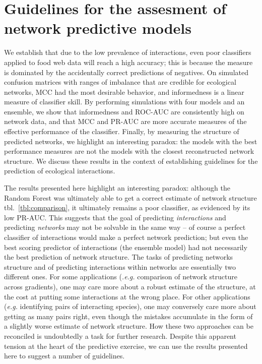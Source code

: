 \documentclass[10pt,oneside]{article}
\begin{document}
\hypertarget{guidelines-for-the-assesment-of-network-predictive-models}{%
\section{Guidelines for the assesment of network predictive
models}\label{guidelines-for-the-assesment-of-network-predictive-models}}

We establish that due to the low prevalence of interactions, even poor
classifiers applied to food web data will reach a high accuracy; this is
because the measure is dominated by the accidentally correct predictions
of negatives. On simulated confusion matrices with ranges of imbalance
that are credible for ecological networks, MCC had the most desirable
behavior, and informedness is a linear measure of classifier skill. By
performing simulations with four models and an ensemble, we show that
informedness and ROC-AUC are consistently high on network data, and that
MCC and PR-AUC are more accurate measures of the effective performance
of the classifier. Finally, by measuring the structure of predicted
networks, we highlight an interesting paradox: the models with the best
performance measures are not the models with the closest reconstructed
network structure. We discuss these results in the context of
establishing guidelines for the prediction of ecological interactions.

The results presented here highlight an interesting paradox: although
the Random Forest was ultimately able to get a correct estimate of
network structure tbl.~\ref{tbl:comparison}, it ultimately remains a
poor classifier, as evidenced by its low PR-AUC. This suggests that the
goal of predicting \emph{interactions} and predicting \emph{networks}
may not be solvable in the same way -- of course a perfect classifier of
interactions would make a perfect network prediction; but even the best
scoring predictor of interactions (the ensemble model) had not
necessarily the best prediction of network structure. The tasks of
predicting networks structure and of predicting interactions within
networks are essentially two different ones. For some applications
(\emph{.e.g.} comparison of network structure across gradients), one may
care more about a robust estimate of the structure, at the cost at
putting some interactions at the wrong place. For other applications
(\emph{e.g.} identifying pairs of interacting species), one may
conversely care more about getting as many pairs right, even though the
mistakes accumulate in the form of a slightly worse estimate of network
structure. How these two approaches can be reconciled is undoubtedly a
task for further research. Despite this apparent tension at the heart of
the predictive exercise, we can use the results presented here to
suggest a number of guidelines.
\end{document}
